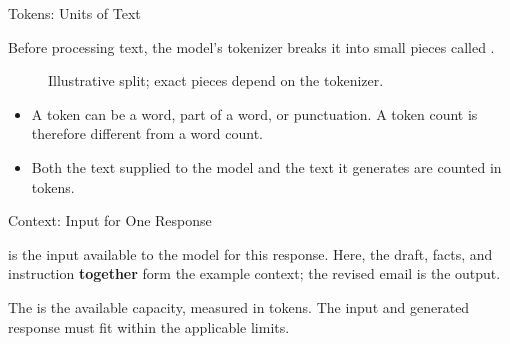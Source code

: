 \begin{frame}{Tokens: Units of Text}
\small
{}\par\smallskip
Before processing text, the model's tokenizer breaks it into small pieces called .
\begin{figure}\centering
{}
\caption{Illustrative split; exact pieces depend on the tokenizer.}
\end{figure}
\begin{itemize}
\item A token can be a word, part of a word, or punctuation. A token count is therefore different from a word count.
\item Both the text supplied to the model and the text it generates are counted in tokens.
\end{itemize}
\end{frame}

\begin{frame}{Context: Input for One Response}
\small
{}\par\smallskip
\begin{figure}\centering
{}
\end{figure}
 is the input available to the model for this response. Here, the draft, facts, and instruction \textbf{together} form the example context; the revised email is the output.
\par\medskip
The  is the available capacity, measured in tokens. The input and generated response must fit within the applicable limits.
\end{frame}

